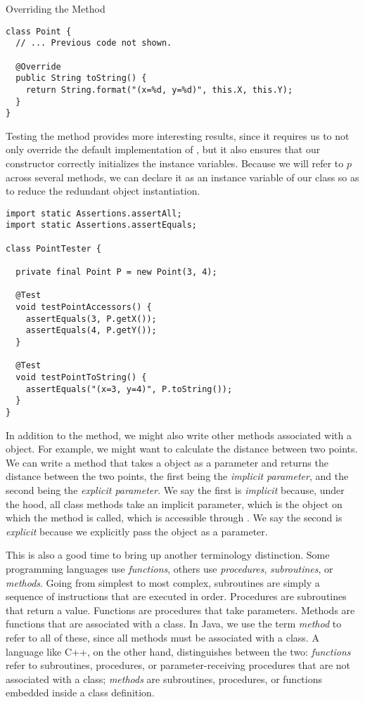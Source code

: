 \begin{cl}[]{Overriding the  Method}
\begin{lstlisting}[language=MyJava]
class Point {
  // ... Previous code not shown.

  @Override
  public String toString() {
    return String.format("(x=%d, y=%d)", this.X, this.Y);
  }
}
\end{lstlisting}
\end{cl}

Testing the  method provides more interesting results, since it requires us to not only override the default implementation of , but it also ensures that our constructor correctly initializes the instance variables. Because we will refer to $p$ across several methods, we can declare it as an instance variable of our  class so as to reduce the redundant object instantiation.

\begin{cl}[]{}
\begin{lstlisting}[language=MyJava]
import static Assertions.assertAll;
import static Assertions.assertEquals;

class PointTester {

  private final Point P = new Point(3, 4);

  @Test
  void testPointAccessors() {
    assertEquals(3, P.getX());
    assertEquals(4, P.getY());
  }

  @Test
  void testPointToString() {
    assertEquals("(x=3, y=4)", P.toString());
  }
}
\end{lstlisting}
\end{cl}

In addition to the  method, we might also write other methods associated with a  object. For example, we might want to calculate the distance between two points. We can write a  method that takes a  object as a parameter and returns the distance between the two points, the first being the \emph{implicit parameter}, and the second being the \emph{explicit parameter}. We say the first is \emph{implicit} because, under the hood, all class methods take an implicit parameter, which is the object on which the method is called, which is accessible through . We say the second is \emph{explicit} because we explicitly pass the object as a parameter. 

This is also a good time to bring up another terminology distinction. Some programming languages use \emph{functions}, others use \emph{procedures}, \emph{subroutines}, or \emph{methods}. Going from simplest to most complex, subroutines are simply a sequence of instructions that are executed in order. Procedures are subroutines that return a value. Functions are procedures that take parameters. Methods are functions that are associated with a class. In Java, we use the term \emph{method} to refer to all of these, since all methods must be associated with a class. A language like C++, on the other hand, distinguishes between the two: \emph{functions} refer to subroutines, procedures, or parameter-receiving procedures that are not associated with a class; \emph{methods} are subroutines, procedures, or functions embedded inside a class definition.

